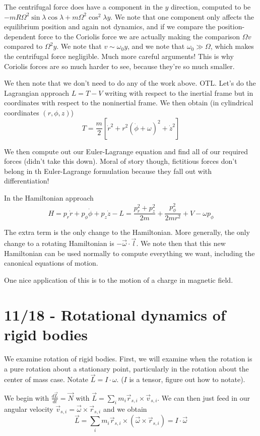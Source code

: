 \documentclass[10pt]{report}
\newcommand{\rd}[2]{\frac{d#1}{d#2}}
\begin{document}
The centrifugal force does have a component in the $y$ direction, computed to be $-mR\Omega^2 \sin \lambda \cos \lambda + m\Omega^2 \cos^2\lambda y$. We note that one component only affects the equilibrium position and again not dynamics, and if we compare the position-dependent force to the Coriolis force we are actually making the comparison $\Omega v$ compared to $\Omega^2 y$. We note that $v \sim \omega_0 y$, and we note that $\omega_0 \gg \Omega$, which makes the centrifugal force negligible. Much more careful arguments! This is why Coriolis forces are so much harder to see, because they're so much smaller.

We then note that we don't need to do any of the work above. OTL. Let's do the Lagrangian approach $L = T-V$ writing with respect to the inertial frame but in coordinates with respect to the noninertial frame. We then obtain (in cylindrical coordinates $(r, \phi, z)$)
$$T = \frac{m}{2}\left[ \dot{r}^2 + r^2\left( \dot{\phi} + \omega \right)^2 + \dot{z}^2 \right]$$

We then compute out our Euler-Lagrange equation and find all of our required forces (didn't take this down). Moral of story though, fictitious forces don't belong in th Euler-Lagrange formulation because they fall out with differentiation!

In the Hamiltonian approach
$$H = p_r \dot{r} + p_\phi\dot{\phi} + p_z \dot{z} - L = \frac{p_r^2 + p_z^2}{2m} + \frac{p_\phi^2}{2mr^2} + V - \omega p_\phi$$

The extra term is the only change to the Hamiltonian. More generally, the only change to a rotating Hamiltonian is $-\vec{\omega} \cdot \vec{l}$. We note then that this new Hamiltonian can be used normally to compute everything we want, including the canonical equations of motion.

One nice application of this is to the motion of a charge in magnetic field. 

\chapter{11/18 - Rotational dynamics of rigid bodies}

We examine rotation of rigid bodies. First, we will examine when the rotation is a pure rotation about a stationary point, particularly in the rotation about the center of mass case. Notate $\vec{L} = I \cdot \omega$. ($I$ is a tensor, figure out how to notate).

We begin with $\rd{\vec{L}}{t} = \vec{N}$ with $\vec{L} = \sum_i m_i \vec{r}_{s,i} \times \vec{v}_{s,i}$. We can then just feed in our angular velocity $\vec{v}_{s,i} = \vec{\omega} \times \vec{r}_{s,i}$ and we obtain
$$\vec{L} = \sum_i m_i \vec{r}_{s,i} \times \left( \vec{\omega} \times \vec{r}_{s,i} \right) = I \cdot \vec{\omega}$$
\end{document}
